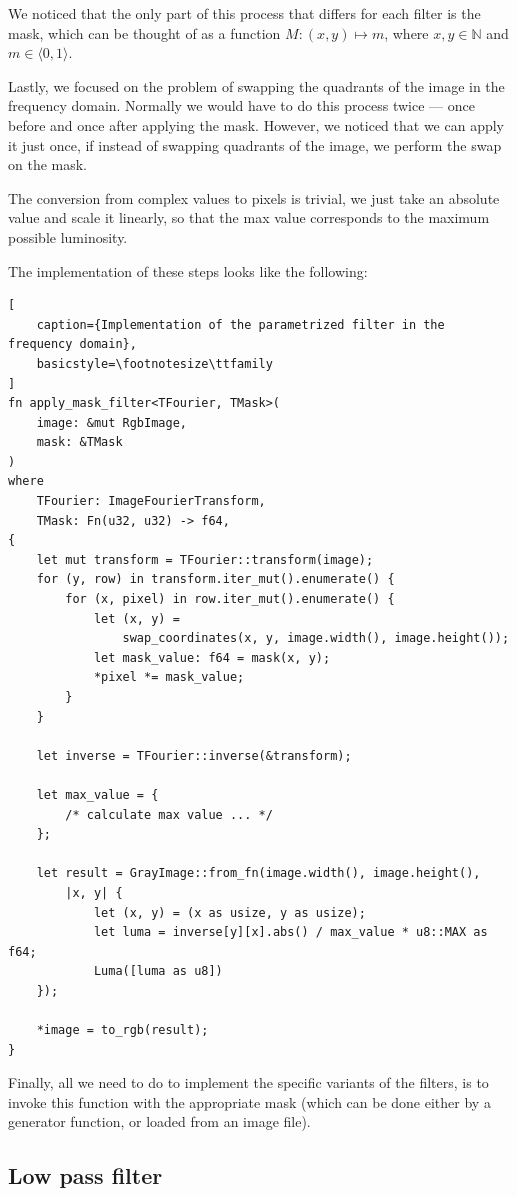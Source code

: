 \documentclass[12pt]{article}
\begin{document}
We noticed that the only part of this process that differs for each filter is the mask, which can be thought of as a function $M: (x, y) \mapsto m$, where $x,y \in \mathbb{N}$ and $m \in \langle 0, 1 \rangle$.

Lastly, we focused on the problem of swapping the quadrants of the image in the frequency domain.
Normally we would have to do this process twice --- once before and once after applying the mask.
However, we noticed that we can apply it just once, if instead of swapping quadrants of the image, we perform the swap on the mask.

The conversion from complex values to pixels is trivial, we just take an absolute value and scale it linearly, so that the max value corresponds to the maximum possible luminosity.

The implementation of these steps looks like the following:

\begin{lstlisting}[
    caption={Implementation of the parametrized filter in the frequency domain},
    basicstyle=\footnotesize\ttfamily
]
fn apply_mask_filter<TFourier, TMask>(
    image: &mut RgbImage, 
    mask: &TMask
)
where
    TFourier: ImageFourierTransform,
    TMask: Fn(u32, u32) -> f64,
{
    let mut transform = TFourier::transform(image);
    for (y, row) in transform.iter_mut().enumerate() {
        for (x, pixel) in row.iter_mut().enumerate() {
            let (x, y) =
                swap_coordinates(x, y, image.width(), image.height());
            let mask_value: f64 = mask(x, y);
            *pixel *= mask_value;
        }
    }

    let inverse = TFourier::inverse(&transform);

    let max_value = {
        /* calculate max value ... */
    };

    let result = GrayImage::from_fn(image.width(), image.height(), 
        |x, y| {
            let (x, y) = (x as usize, y as usize);
            let luma = inverse[y][x].abs() / max_value * u8::MAX as f64;
            Luma([luma as u8])
    });

    *image = to_rgb(result);
}
\end{lstlisting}

Finally, all we need to do to implement the specific variants of the filters, is to invoke this function with the appropriate mask (which can be done either by a generator function, or loaded from an image file).

\subsection{Low pass filter}
\end{document}
